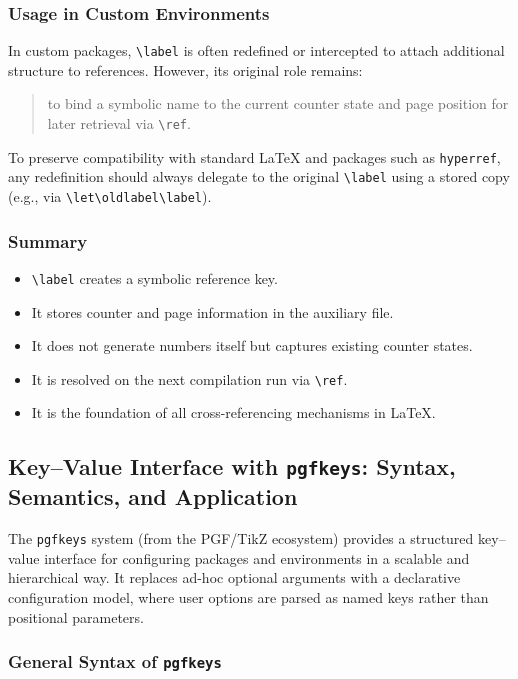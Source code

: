 \subsubsection{Usage in Custom Environments}

In custom packages, \lstinline|\label| is often redefined or intercepted to attach additional structure to references. However, its original role remains:

\begin{quote}
to bind a symbolic name to the current counter state and page position for later retrieval via \texttt{\textbackslash ref}.
\end{quote}

To preserve compatibility with standard LaTeX and packages such as \texttt{hyperref}, any redefinition should always delegate to the original \lstinline|\label| using a stored copy (e.g., via \lstinline|\let\oldlabel\label|).

\subsubsection{Summary}

\begin{itemize}
\item \texttt{\textbackslash label} creates a symbolic reference key.
\item It stores counter and page information in the auxiliary file.
\item It does not generate numbers itself but captures existing counter states.
\item It is resolved on the next compilation run via \texttt{\textbackslash ref}.
\item It is the foundation of all cross-referencing mechanisms in \LaTeX.
\end{itemize}
\subsection{Key--Value Interface with \texttt{pgfkeys}: Syntax, Semantics, and Application}

The \texttt{pgfkeys} system (from the PGF/TikZ ecosystem) provides a structured key--value interface for configuring packages and environments in a scalable and hierarchical way. It replaces ad-hoc optional arguments with a declarative configuration model, where user options are parsed as named keys rather than positional parameters.

\subsubsection{General Syntax of \texttt{pgfkeys}}

